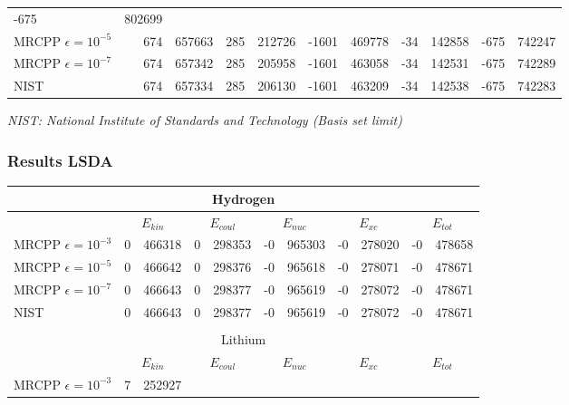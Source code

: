 \documentclass[mathserif]{beamer}
\begin{document}
\begin{frame}
\begin{table}
\begin{tabular}{|l|r@{.}l|r@{.}l|r@{.}l|r@{.}l|r@{.}l|}
			 -675&802699\\
			MRCPP $\epsilon=10^{-5}$&
			  674&657663&
			  285&212726&
			-1601&469778&
			  -34&142858&
			 -675&742247\\
			MRCPP $\epsilon=10^{-7}$&
			  674&657342&
			  285&205958&
			-1601&463058&
			  -34&142531&
			 -675&742289\\
			\hline
			NIST&
			  674&657334&
			  285&206130&
			-1601&463209&
			  -34&142538&
			 -675&742283\\
			\hline
		\end{tabular}
	\end{table}
	\tiny
	\it{NIST: National Institute of Standards and Technology (Basis set limit)}\\
\end{frame}

\begin{frame}
	\frametitle{Results LSDA}
	\begin{table}
		\tiny
		\centering
		\begin{tabular}{|l|r@{.}l|r@{.}l|r@{.}l|r@{.}l|r@{.}l|}
			\multicolumn{11}{c}{Hydrogen}\\
			\hline
			&
			\multicolumn{2}{c|}{$E_{kin}$}&
			\multicolumn{2}{c|}{$E_{coul}$}&
			\multicolumn{2}{c|}{$E_{nuc}$}&
			\multicolumn{2}{c|}{$E_{xc}$}&
			\multicolumn{2}{c|}{$E_{tot}$}\\
			\hline
			MRCPP $\epsilon=10^{-3}$&
			  0&466318&
			  0&298353&
			 -0&965303&
			 -0&278020&
			 -0&478658\\
			MRCPP $\epsilon=10^{-5}$&
			  0&466642&
			  0&298376&
			 -0&965618&
			 -0&278071&
			 -0&478671\\
			MRCPP $\epsilon=10^{-7}$&
			  0&466643&
			  0&298377&
			 -0&965619&
			 -0&278072&
			 -0&478671\\
			\hline
			NIST&
			  0&466643&
			  0&298377&
			 -0&965619&
			 -0&278072&
			 -0&478671\\
			\hline
			\multicolumn{11}{c}{}\\
			\multicolumn{11}{c}{Lithium}\\
			\hline
			&
			\multicolumn{2}{c|}{$E_{kin}$}&
			\multicolumn{2}{c|}{$E_{coul}$}&
			\multicolumn{2}{c|}{$E_{nuc}$}&
			\multicolumn{2}{c|}{$E_{xc}$}&
			\multicolumn{2}{c|}{$E_{tot}$}\\
			\hline
			MRCPP $\epsilon=10^{-3}$&
			  7&252927&

\end{tabular}
\end{table}
\end{frame}
\end{document}
